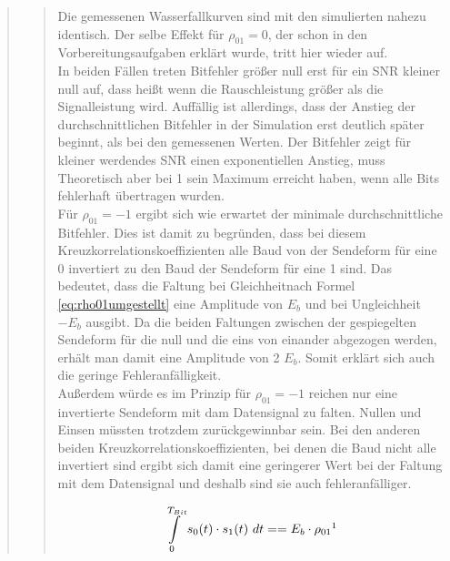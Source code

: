 \begin{quote}
\begin{quote}
       \vspace{2em}    
    
    Die gemessenen Wasserfallkurven sind mit den simulierten nahezu identisch. Der selbe Effekt für $\rho_{01}=0$, der
    schon in den Vorbereitungsaufgaben erklärt wurde, tritt hier wieder auf.\\
    In beiden Fällen treten Bitfehler größer null erst für ein SNR kleiner null auf, dass heißt
    wenn die Rauschleistung größer als die Signalleistung wird. Auffällig ist allerdings, dass der Anstieg der
    durchschnittlichen Bitfehler in der Simulation erst deutlich später beginnt, als bei den gemessenen Werten.
    Der Bitfehler zeigt für kleiner werdendes SNR einen exponentiellen Anstieg, muss Theoretisch aber bei 1 sein Maximum
    erreicht haben, wenn alle Bits fehlerhaft übertragen wurden.\\
    Für $\rho_{01}=-1$ ergibt sich wie erwartet der minimale durchschnittliche Bitfehler. Dies ist damit zu begründen,
    dass bei diesem Kreuzkorrelationskoeffizienten alle Baud von der Sendeform für eine 0 invertiert zu den Baud der
    Sendeform für eine 1 sind. Das bedeutet, dass die Faltung bei Gleichheitnach Formel \ref{eq:rho01umgestellt} eine
    Amplitude von $E_{b}$ und bei Ungleichheit $-E_{b}$ ausgibt. Da die beiden Faltungen zwischen der gespiegelten Sendeform für die null und die eins
    von einander abgezogen werden, erhält man damit eine Amplitude von 2 $E_{b}$. Somit erklärt sich auch die geringe
    Fehleranfälligkeit. \\
    Außerdem würde es im Prinzip für $\rho_{01}=-1$ reichen nur eine invertierte Sendeform mit dam
    Datensignal zu falten. Nullen und Einsen müssten trotzdem zurückgewinnbar sein. Bei den anderen beiden 
    Kreuzkorrelationskoeffizienten, bei denen die Baud nicht alle invertiert sind ergibt sich damit eine geringerer Wert
    bei der Faltung mit dem Datensignal und deshalb sind sie auch fehleranfälliger.
    
    \begin{equation}
	     \begin{split}
		\int\limits_{0}^{T_{Bit}}  s_{0}(t) \cdot s_{1}(t)  \ dt = = E_{b} \cdot \rho_{01}
           \footnotemark
	     \end{split}
    \end{equation} 
     \label{eq:rho01umgestellt}
    
    \end{quote}
     
\end{quote}

